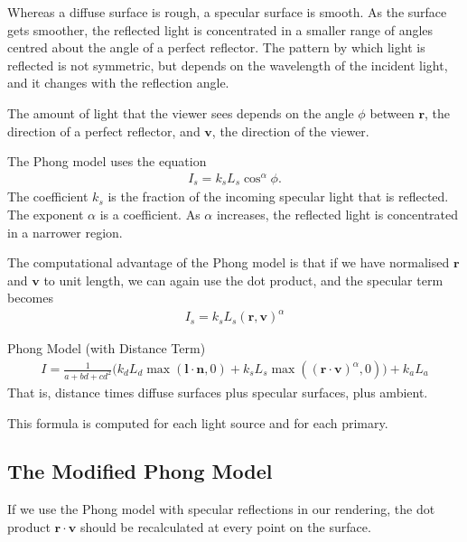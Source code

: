 \documentclass[../COS3712_Notes.tex]{subfiles}
\begin{document}
        Whereas a diffuse surface is rough, a specular surface is smooth.
        As the surface gets smoother, the reflected light is concentrated in a smaller range
        of angles centred about the angle of a perfect reflector.
        The pattern by which light is reflected is not symmetric,
        but depends on the wavelength of the incident light,
        and it changes with the reflection angle.

        The amount of light that the viewer sees depends on the angle $\phi$ between
        $\mathbf{r}$, the direction of a perfect reflector,
        and $\mathbf{v}$, the direction of the viewer.

        The Phong model uses the equation
        \begin{align*}
          I_s = k_s L_s \cos^{\alpha} \phi.
        \end{align*}
        The coefficient $k_s$ is the fraction of the incoming specular light that is reflected.
        The exponent $\alpha$ is a  coefficient.
        As $\alpha$ increases, the reflected light is concentrated in a narrower region.

        The computational advantage of the Phong model is that if we have normalised
        $\mathbf{r}$ and $\mathbf{v}$ to unit length,
        we can again use the dot product, and the specular term becomes
        \begin{align*}
          I_s = k_s L_s (\mathbf{r}, \mathbf{v})^{\alpha}
        \end{align*}

        \begin{theorem}{Phong Model (with Distance Term)}
          \begin{align*}
            I = \frac{1}{a + bd + cd^2}\bigl(k_d L_d \max(\mathbf{l} \cdot \mathbf{n}, 0)
            + k_s L_s \max\left((\mathbf{r} \cdot \mathbf{v})^{\alpha}, 0\right) \bigr)
            + k_a L_a
          \end{align*}
          That is, distance times diffuse surfaces plus specular surfaces, plus ambient.

          This formula is computed for each light source and for each primary.
        \end{theorem}

      \subsection{The Modified Phong Model}
        If we use the Phong model with specular reflections in our rendering,
        the dot product $\mathbf{r} \cdot \mathbf{v}$ should be recalculated at every point
        on the surface.
\end{document}
